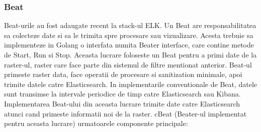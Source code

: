 \documentclass[12pt]{report}
\begin{document}
			\subsubsection{Beat}
Beat-urile au fost adaugate recent la stack-ul ELK. Un Beat are responsabilitatea sa colecteze date si sa le trimita spre procesare sau vizualizare. Acesta trebuie sa implementeze in Golang o interfata numita Beater interface, care contine metode de Start, Run si Stop. Aceasta lucrare foloseste un Beat pentru a primi date de la raster-ul, raster care face parte din sistemul de filtre mentionat anterior. Beat-ul primeste raster data, face operatii de procesare si sanitization minimale, apoi trimite datele catre Elasticsearch. In implementarile conventionale de Beat, datele sunt transimse la intervale periodice de timp catre Elasticsearch sau Kibana. Implementarea Beat-ului din aceasta lucrare trimite date catre Elasticsearch atunci cand primeste informatii noi de la raster. cBeat (Beater-ul implementat pentru aceasta lucrare) urmatoarele componente principale:
\end{document}
